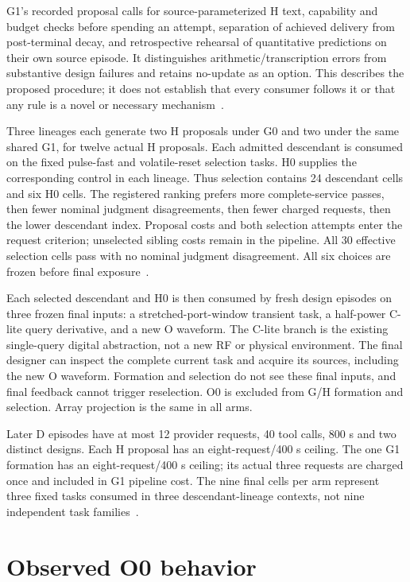 G1's recorded proposal calls for source-parameterized H text, capability and
budget checks before spending an attempt, separation of achieved delivery from
post-terminal decay, and retrospective rehearsal of quantitative predictions
on their own source episode. It distinguishes arithmetic/transcription errors
from substantive design failures and retains no-update as an option. This
describes the proposed procedure; it does not establish that every consumer
follows it or that any rule is a novel or necessary mechanism~\cite{parents}.

Three lineages each generate two H proposals under G0 and two under the same
shared G1, for twelve actual H proposals. Each admitted descendant is consumed
on the fixed pulse-fast and volatile-reset selection tasks. H0 supplies the
corresponding control in each lineage. Thus selection contains 24 descendant
cells and six H0 cells. The registered ranking prefers more complete-service
passes, then fewer nominal judgment disagreements, then fewer charged requests,
then the lower descendant index. Proposal costs and both selection attempts
enter the request criterion; unselected sibling costs remain in the pipeline.
All 30 effective selection cells pass with no nominal judgment disagreement.
All six choices are frozen before final exposure~\cite{selection}.

Each selected descendant and H0 is then consumed by fresh design episodes on
three frozen final inputs: a stretched-port-window transient task, a half-power
C-lite query derivative, and a new O waveform. The C-lite branch is the
existing single-query digital abstraction, not a new RF or physical environment.
The final designer can inspect the complete current task and acquire its
sources, including the new O waveform. Formation and selection do not see these
final inputs, and final feedback cannot trigger reselection. O0 is excluded
from G/H formation and selection. Array projection is the same in all arms.

Later D episodes have at most 12 provider requests, 40 tool calls, 800 s and
two distinct designs. Each H proposal has an eight-request/400 s ceiling.
The one G1 formation has an eight-request/400 s ceiling; its actual three
requests are charged once and included in G1 pipeline cost. The nine final
cells per arm represent three fixed tasks consumed in three descendant-lineage
contexts, not nine independent task families~\cite{protocol,analysis}.

\section{Observed O0 behavior}
